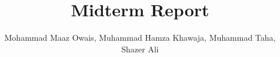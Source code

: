 \documentclass[pageno]{jpaper}
\begin{document}
\date{}

\title{Midterm Report}
\author{Mohammad Maaz Owais, Muhammad Hamza Khawaja, Muhammad Taha, Shazer Ali}

\maketitle






\newpage



\end{document}

